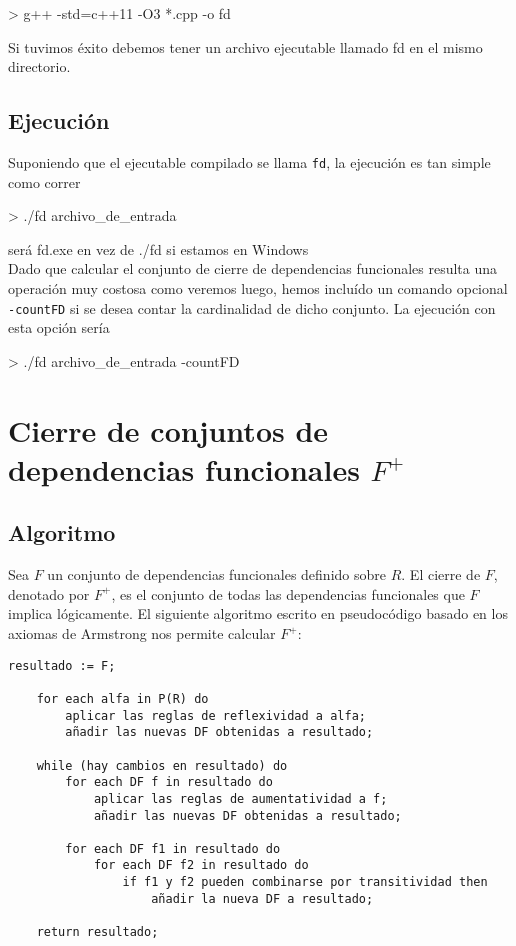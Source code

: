 \documentclass{article}
\begin{document}
\begin{commandshell}
> g++ -std=c++11 -O3 *.cpp -o fd
\end{commandshell}

Si tuvimos éxito debemos tener un archivo ejecutable llamado fd en el mismo directorio.

\subsection{Ejecución}
Suponiendo que el ejecutable compilado se llama \verb|fd|, la ejecución es tan simple como correr

\begin{commandshell}
> ./fd archivo_de_entrada
\end{commandshell}
\small{será fd.exe en vez de ./fd si estamos en Windows} \\

Dado que calcular el conjunto de cierre de dependencias funcionales resulta una operación muy costosa como veremos luego, hemos incluído un comando opcional \verb|-countFD| si se desea contar la cardinalidad de dicho conjunto. La ejecución con esta opción sería

\begin{commandshell}
> ./fd archivo_de_entrada -countFD
\end{commandshell}

\newpage
\section{Cierre de conjuntos de dependencias funcionales $F^{+}$}
\subsection{Algoritmo}
Sea $F$ un conjunto de dependencias funcionales definido sobre $R$. El cierre de $F$, denotado por $F^{+}$, es el conjunto de todas las dependencias funcionales que $F$ implica lógicamente. El siguiente algoritmo escrito en pseudocódigo basado en los axiomas de Armstrong nos permite calcular $F^{+}$:

\begin{Verbatim}[frame=single]
    resultado := F;
    
    for each alfa in P(R) do
        aplicar las reglas de reflexividad a alfa;
        añadir las nuevas DF obtenidas a resultado;
        
    while (hay cambios en resultado) do
        for each DF f in resultado do
            aplicar las reglas de aumentatividad a f;
            añadir las nuevas DF obtenidas a resultado;
            
        for each DF f1 in resultado do
            for each DF f2 in resultado do
                if f1 y f2 pueden combinarse por transitividad then
                    añadir la nueva DF a resultado;
                
    return resultado;
\end{Verbatim}
\end{document}
